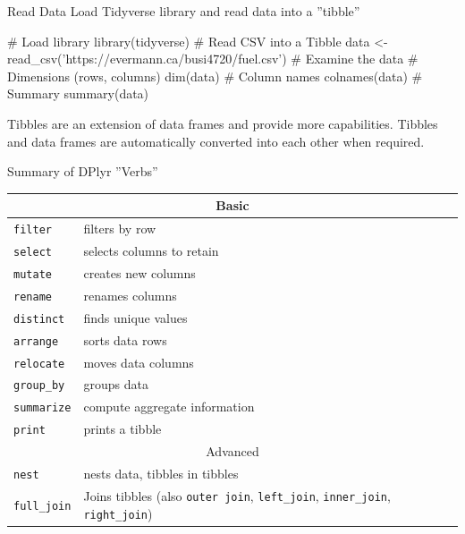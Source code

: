 \documentclass[ignorenonframetext,xcolor=x11names]{beamer}
\begin{document}
\begin{frame}[label=full,fragile]{Read Data}
Load Tidyverse library and read data into a ''tibble''

\begin{Rcode}
# Load library
library(tidyverse)
# Read CSV into a Tibble
data <- read_csv('https://evermann.ca/busi4720/fuel.csv')
# Examine the data
# Dimensions (rows, columns)
dim(data)
# Column names
colnames(data)
# Summary
summary(data)
\end{Rcode}

Tibbles are an extension of data frames and provide more capabilities. Tibbles and data frames are automatically converted into each other when required.
\end{frame}


\begin{frame}[label=full]{Summary of DPlyr ''Verbs''}

\footnotesize
\centering
\renewcommand{\arraystretch}{1.25}

\begin{tabularx}{\textwidth}{l|X} \hline
\multicolumn{2}{c}{Basic} \\ \hline
\texttt{filter} & filters by row \\
\texttt{select} & selects columns to retain \\
\texttt{mutate} & creates new columns \\
\texttt{rename} & renames columns \\
\texttt{distinct} & finds unique values \\
\texttt{arrange} & sorts data rows \\
\texttt{relocate} & moves data columns \\
\texttt{group\_by} & groups data \\
\texttt{summarize} & compute aggregate information \\
\texttt{print} & prints a tibble \\  \hline
\multicolumn{2}{c}{Advanced} \\ \hline
\texttt{nest} & nests data, tibbles in tibbles \\
\texttt{full\_join} & Joins tibbles (also \texttt{outer join}, \texttt{left\_join}, \texttt{inner\_join}, \texttt{right\_join}) \\ \hline
\end{tabularx}

\end{frame}
\end{document}
